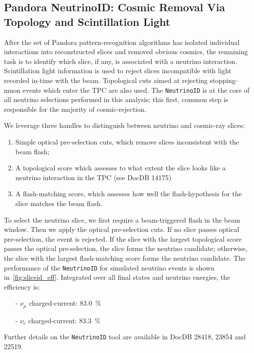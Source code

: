 \subsection{Pandora NeutrinoID: Cosmic Removal Via Topology and Scintillation Light}
\label{sec:sliceID:NeutrinoID}
\par After the set of Pandora pattern-recognition algorithms has isolated individual interactions into reconstructed slices and removed obvious cosmics, the remaining task is to identify which slice, if any, is associated with a neutrino interaction. Scintillation light information is used to reject slices incompatible with light recorded in-time with the beam. Topological cuts aimed at rejecting stopping-muon events which enter the TPC are also used. The \texttt{NeutrinoID} is at the core of all neutrino selections performed in this analysis; this first, common step is responsible for the majority of cosmic-rejection.
\\
\par We leverage three handles to distinguish between neutrino and cosmic-ray slices:
\begin{enumerate}
    \item Simple optical pre-selection cuts, which remove slices inconsistent with the beam flash;
    \item A topological score which assesses to what extent the slice looks like a neutrino interaction in the TPC (see DocDB 14175)
    \item A flash-matching score, which assesses how well the flash-hypothesis for the slice matches the beam flash.
\end{enumerate}

To select the neutrino slice, we first require a beam-triggered flash in the beam window. Then we apply the optical pre-selection cuts. If no slice passes optical pre-selection, the event is rejected. If the slice with the largest topological score passes the optical pre-selection, the slice forms the neutrino candidate; otherwise, the slice with the largest  flash-matching score forms the neutrino candidate. 
The performance of the \texttt{NeutrinoID} for simulated neutrino events is shown in~\cref{fig:sliceid_eff}.
Integrated over all final states and neutrino energies, the efficiency is:
\begin{itemize}
    \item[-] $\nu_\mu$ charged-current: \SI{83.0}{\%}
    \item[-] $\nu_e$ charged-current: \SI{83.3}{\%}
\end{itemize}
Further details on the \texttt{NeutrinoID} tool are available in DocDB 28418, 23854 and 22519.

